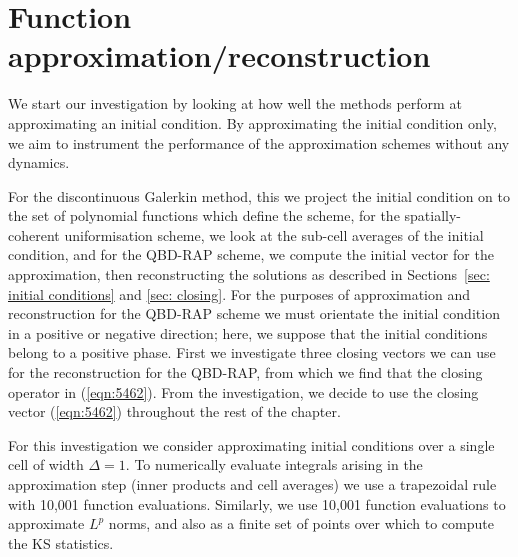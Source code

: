 


	




\section{Function approximation/reconstruction}\label{sec: recon num}
We start our investigation by looking at how well the methods perform at approximating an initial condition. By approximating the initial condition only, we aim to instrument the performance of the approximation schemes without any dynamics.

For the discontinuous Galerkin method, this we project the initial condition on to the set of polynomial functions which define the scheme, for the spatially-coherent uniformisation scheme, we look at the sub-cell averages of the initial condition, and for the QBD-RAP scheme, we compute the initial vector for the approximation, then reconstructing the solutions as described in Sections~\ref{sec: initial conditions} and \ref{sec: closing}. For the purposes of approximation and reconstruction for the QBD-RAP scheme we must orientate the initial condition in a positive or negative direction; here, we suppose that the initial conditions belong to a positive phase. First we investigate three closing vectors we can use for the reconstruction for the QBD-RAP, from which we find that the closing operator in (\ref{eqn:5462}). From the investigation, we decide to use the closing vector (\ref{eqn:5462}) throughout the rest of the chapter.

For this investigation we consider approximating initial conditions over a single cell of width \(\Delta = 1\). To numerically evaluate integrals arising in the approximation step (inner products and cell averages) we use a trapezoidal rule with 10,001 function evaluations. Similarly, we use 10,001 function evaluations to approximate \(L^p\) norms, and also as a finite set of points over which to compute the KS statistics. 

